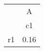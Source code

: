 \begin{tabular}{l*{1}{c}}
\hline\hline
            &           A\\
            &          c1\\
\hline
r1          &        0.16\\
\hline\hline
\end{tabular}
